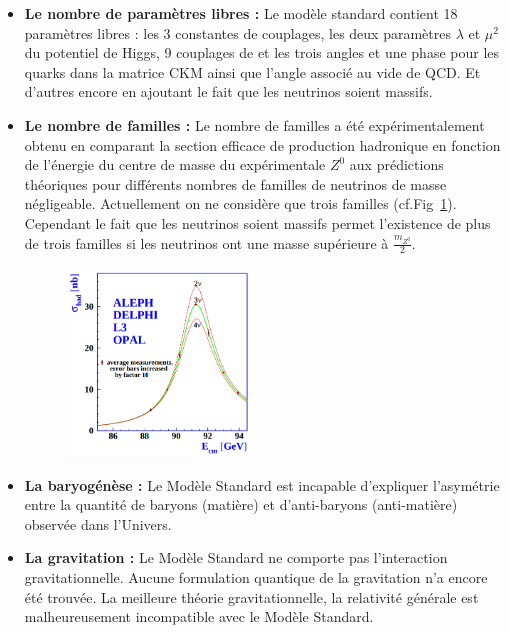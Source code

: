 \begin{itemize}[label=$\bullet$]
\item \textbf{Le nombre de paramètres libres :} Le modèle standard contient \num{18} paramètres libres : les \num{3} constantes de couplages, les deux paramètres $\lambda$ et $\mu^2$ du potentiel de Higgs, \num{9} couplages de  et les trois angles et une phase pour les quarks dans la matrice CKM ainsi que l'angle associé au vide de QCD. Et d'autres encore en ajoutant le fait que les neutrinos soient massifs.

\item \textbf{Le nombre de familles :} Le nombre de familles a été expérimentalement obtenu en comparant la section efficace de production hadronique en fonction de l'énergie du centre de masse du expérimentale $Z^{0}$ aux prédictions théoriques pour différents nombres de familles de neutrinos de masse négligeable. Actuellement on ne considère que trois familles (cf.Fig~\ref{neutrinos}). Cependant le fait que les neutrinos soient massifs permet l'existence de plus de trois familles si les neutrinos ont une masse supérieure à $\frac{m_{Z^{0}}}{2}$.
\begin{figure}[ht!]
\centering
\includegraphics[width=0.48\textwidth]{SM/neutrinos.png}
\label{neutrinos}
\end{figure}

\item \textbf{La baryogénèse :} Le Modèle Standard est incapable d'expliquer l'asymétrie entre la quantité de baryons (matière) et d'anti-baryons (anti-matière) observée dans l'Univers.

\item \textbf{La gravitation :} Le Modèle Standard ne comporte pas l'interaction gravitationnelle. Aucune formulation quantique de la gravitation n'a encore été trouvée. La meilleure théorie gravitationnelle, la relativité générale est malheureusement incompatible avec le Modèle Standard.


\end{itemize}
